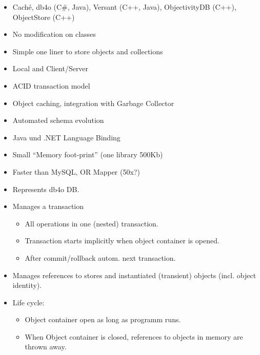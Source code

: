 \begin{breakbox}
\begin{itemize}
	\item Caché, db4o (C\#, Java), Versant (C++, Java), ObjectivityDB (C++), ObjectStore (C++)
\end{itemize}
\end{breakbox}

\begin{breakbox}
\begin{itemize}
	\item No modification on classes
	\item Simple one liner to store objects and collections
	\item Local and Client/Server
	\item ACID transaction model
	\item Object caching, integration with Garbage Collector
	\item Automated schema evolution
	\item Java und .NET Language Binding
	\item Small “Memory foot-print” (one library 500Kb)
	\item Faster than MySQL, OR Mapper (50x?)
\end{itemize}
\end{breakbox}

\begin{breakbox}
\begin{itemize}
	\item Represents db4o DB.
	\item Manages a transaction
		\begin{itemize}
			\item All operations in one (nested) transaction.
			\item Transaction starts implicitly when object container is opened.
			\item After commit/rollback autom. next transaction.
		\end{itemize}
	\item Manages references to stores and instantiated (transient) objects (incl. object identity).
	\item Life cycle:
		\begin{itemize}
			\item Object container open as long as programm runs.
			\item When Object container is closed, references to objects in memory are thrown away.
		\end{itemize}
\end{itemize}
\end{breakbox}


